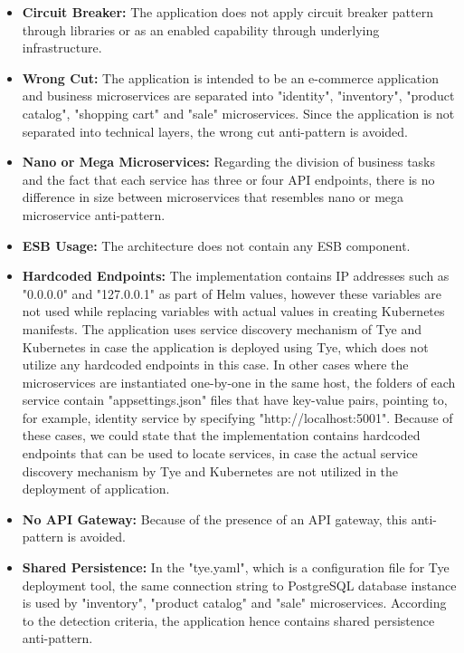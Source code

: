 \documentclass{Configuration_Files/PoliMi3i_thesis}
\begin{document}
\begin{itemize}
    \item \textbf{Circuit Breaker:} The application does not apply circuit breaker pattern through libraries or as an enabled capability through underlying infrastructure.
    
    \item \textbf{Wrong Cut:} The application is intended to be an e-commerce application and business microservices are separated into "identity", "inventory", "product catalog", "shopping cart" and "sale" microservices.
    Since the application is not separated into technical layers, the wrong cut anti-pattern is avoided.

    \item \textbf{Nano or Mega Microservices:} Regarding the division of business tasks and the fact that each service has three or four API endpoints, there is no difference in size between microservices that resembles nano or mega microservice anti-pattern.
    
    \item \textbf{ESB Usage:} The architecture does not contain any ESB component.
    
    \item \textbf{Hardcoded Endpoints:} The implementation contains IP addresses such as "0.0.0.0" and "127.0.0.1" as part of Helm values, however these variables are not used while replacing variables with actual values in creating Kubernetes manifests.
    The application uses service discovery mechanism of Tye and Kubernetes in case the application is deployed using Tye, which does not utilize any hardcoded endpoints in this case.
    In other cases where the microservices are instantiated one-by-one in the same host, the folders of each service contain "appsettings.json" files that have key-value pairs, pointing to, for example, identity service by specifying "http://localhost:5001".
    Because of these cases, we could state that the implementation contains hardcoded endpoints that can be used to locate services, in case the actual service discovery mechanism by Tye and Kubernetes are not utilized in the deployment of application.
    
    \item \textbf{No API Gateway:} Because of the presence of an API gateway, this anti-pattern is avoided.
    
    \item \textbf{Shared Persistence:} In the "tye.yaml", which is a configuration file for Tye deployment tool, the same connection string to PostgreSQL database instance is used by "inventory", "product catalog" and "sale" microservices.
    According to the detection criteria, the application hence contains shared persistence anti-pattern.
    

\end{itemize}
\end{document}
